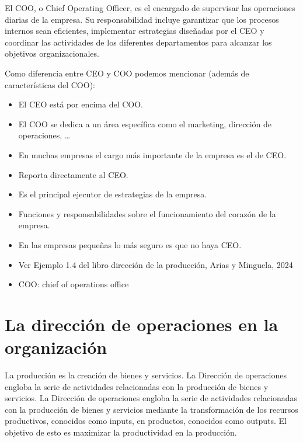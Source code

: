 \documentclass[12pt]{report} %
\providecommand{\tightlist}{%
  \setlength{\itemsep}{0pt}\setlength{\parskip}{0pt}}
\begin{document}
\begin{definicion}
El COO, o Chief Operating Officer, es el encargado de supervisar las operaciones diarias de la empresa. Su responsabilidad incluye garantizar que los procesos internos sean eficientes, implementar estrategias diseñadas por el CEO y coordinar las actividades de los diferentes departamentos para alcanzar los objetivos organizacionales.
\end{definicion}

Como diferencia entre CEO y COO podemos mencionar (además de
características del COO):

\begin{itemize}
\tightlist
\item
  El CEO está por encima del COO.\\
\item
  El COO se dedica a un área específica como el marketing, dirección de
  operaciones, \ldots{}\\
\item
  En muchas empresas el cargo más importante de la empresa es el de
  CEO.\\
\item
  Reporta directamente al CEO.\\
\item
  Es el principal ejecutor de estrategias de la empresa.\\
\item
  Funciones y responsabilidades sobre el funcionamiento del corazón de
  la empresa.\\
\item
  En las empresas pequeñas lo más seguro es que no haya CEO.\\
\item
  Ver Ejemplo 1.4 del libro dirección de la producción, Arias y
  Minguela, 2024\\
\item
  COO: chief of operations office
\end{itemize}

\hypertarget{la-direcciuxf3n-de-operaciones-en-la-organizaciuxf3n}{%
\section{La dirección de operaciones en la
organización}\label{la-direcciuxf3n-de-operaciones-en-la-organizaciuxf3n}}

La producción es la creación de bienes y servicios. La Dirección de
operaciones engloba la serie de actividades relacionadas con la
producción de bienes y servicios. La Dirección de operaciones engloba la
serie de actividades relacionadas con la producción de bienes y
servicios mediante la transformación de los recursos productivos,
conocidos como inputs, en productos, conocidos como outputs. El objetivo
de esto es maximizar la productividad en la producción.
\end{document}
